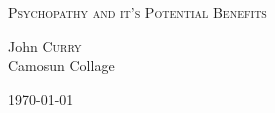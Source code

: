\begin{titlepage}
\begin{center}
\textsc{\huge Psychopathy and it's Potential Benefits}\\[1.5cm]

\begin{minipage}{0.4\textwidth}
\begin{flushleft} \large
John \textsc{Curry}\\
Camosun Collage
\end{flushleft}
\end{minipage}
\vfill
{\large \today}
\end{center}
\end{titlepage}

